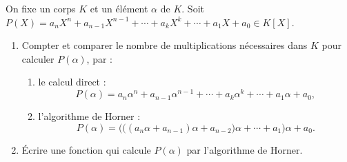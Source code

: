 \begin{frame}
\begin{tp}
On fixe un corps $K$ et un élément $\alpha$ de $K$. Soit $P(X) = a_nX^n+a_{n-1}X^{n-1}+\cdots +a_kX^k+\cdots+ a_1X+a_0 \in K[X]$.



\begin{enumerate}
  \item Compter et comparer le nombre de multiplications nécessaires dans $K$ pour calculer 
  $P(\alpha)$, par :
 \begin{enumerate}
    \item le calcul direct :
    $$P(\alpha) = a_n \alpha^n+a_{n-1} \alpha^{n-1}+\cdots +a_k \alpha^k+\cdots+ a_1 \alpha +a_0,$$
    
    
    \item l'algorithme de Horner :
    $$P(\alpha) =  \Big(\big((a_n \alpha+a_{n-1})\alpha +a_{n-2} \big) \alpha + \cdots +a_1\Big) \alpha +a_0.$$
    \end{enumerate}

    \item \'Ecrire une fonction qui calcule $P(\alpha)$ par l'algorithme de Horner.
  \end{enumerate}
  \end{tp}
\end{frame}


